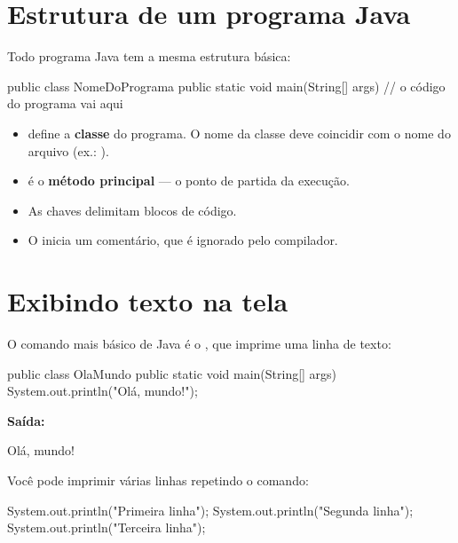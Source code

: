 \documentclass[11pt,a4paper]{article}
\begin{document}
\section{Estrutura de um programa Java}

Todo programa Java tem a mesma estrutura básica:

\begin{javacode}
public class NomeDoPrograma {
    public static void main(String[] args) {
        // o código do programa vai aqui
    }
}
\end{javacode}

\begin{itemize}
  \item {} define a \textbf{classe} do programa. O nome da classe deve coincidir com o nome do arquivo (ex.: ).
  \item {} é o \textbf{método principal} — o ponto de partida da execução.
  \item As chaves \inlinecode{\{ \}} delimitam blocos de código.
  \item O \inlinecode{//} inicia um comentário, que é ignorado pelo compilador.
\end{itemize}

\section{Exibindo texto na tela}

O comando mais básico de Java é o , que imprime uma linha de texto:

\begin{javacode}
public class OlaMundo {
    public static void main(String[] args) {
        System.out.println("Olá, mundo!");
    }
}
\end{javacode}

\textbf{Saída:}
\begin{javacode}
Olá, mundo!
\end{javacode}

Você pode imprimir várias linhas repetindo o comando:

\begin{javacode}
System.out.println("Primeira linha");
System.out.println("Segunda linha");
System.out.println("Terceira linha");
\end{javacode}
\end{document}
